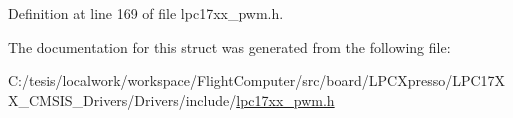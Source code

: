 \-Definition at line 169 of file lpc17xx\-\_\-pwm.\-h.



\-The documentation for this struct was generated from the following file\-:\begin{DoxyCompactItemize}
\item 
\-C\-:/tesis/localwork/workspace/\-Flight\-Computer/src/board/\-L\-P\-C\-Xpresso/\-L\-P\-C17\-X\-X\-\_\-\-C\-M\-S\-I\-S\-\_\-\-Drivers/\-Drivers/include/\hyperlink{lpc17xx__pwm_8h}{lpc17xx\-\_\-pwm.\-h}\end{DoxyCompactItemize}
